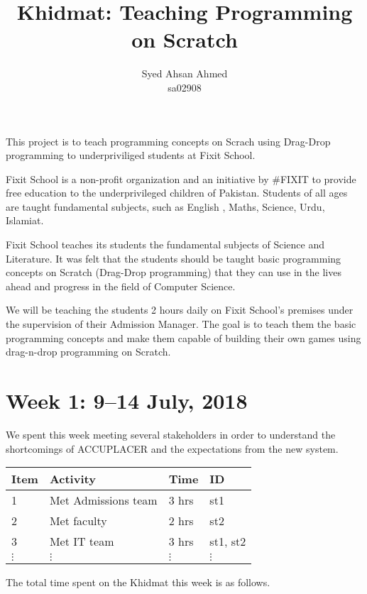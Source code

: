 \documentclass{article}
\title {Khidmat: Teaching Programming on Scratch}
\author{
  Syed Ahsan Ahmed\\ sa02908
}
\date{}
\begin{document}
\maketitle

This project is to teach programming concepts on Scrach using Drag-Drop programming to underpriviliged students at Fixit School.

Fixit School is a non-profit organization and an initiative by #FIXIT to provide free education to the underprivileged children of Pakistan. Students of all ages are taught fundamental subjects, such as English , Maths, Science, Urdu, Islamiat. 

Fixit School teaches its students the fundamental subjects of Science and Literature. It was felt that the students should be taught basic programming concepts on Scratch (Drag-Drop programming) that they can use in the lives ahead and progress in the field of Computer Science.

We will be teaching the students 2 hours daily on Fixit School's premises under the supervision of their Admission Manager. The goal is to teach them the basic programming concepts and make them capable of building their own games using drag-n-drop programming on Scratch.

\newpage %
\section*{Week 1: 9--14 July, 2018}

We spent this week meeting several stakeholders in order to understand the shortcomings of ACCUPLACER and the expectations from the new system.

\begin{tabular}{|l|l|l|l|}
  \hline
  Item 	& Activity & Time & ID \\\hline\hline
  1	& Met Admissions team & 3 hrs & st1 \\\hline
  2	& Met faculty & 2 hrs & st2 \\\hline
  3	& Met IT team & 3 hrs & st1, st2 \\\hline
  $\vdots$ & $\vdots$ & $\vdots$ & $\vdots$ \\\hline
\end{tabular}

The total time spent on the Khidmat this week is as follows.
\end{document}
